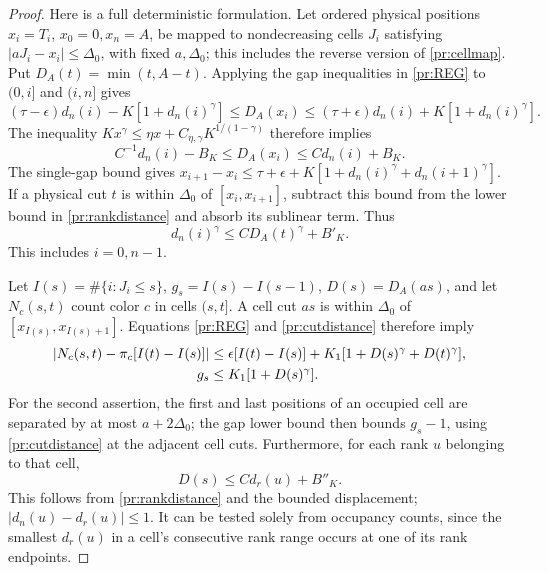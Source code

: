 \begin{proof}
Here is a full deterministic formulation. Let ordered physical positions
$x_i=T_i$, $x_0=0,x_n=A$, be mapped to nondecreasing cells $J_i$ satisfying
$|aJ_i-x_i|\le\Delta_0$, with fixed $a,\Delta_0$; this includes the reverse
version of \eqref{pr:cellmap}. Put $D_A(t)=\min(t,A-t)$.
Applying the gap inequalities in \eqref{pr:REG} to $(0,i]$ and $(i,n]$
gives
\[
 (\tau-\epsilon)d_n(i)-K[1+d_n(i)^\gamma]
 \le D_A(x_i)\le
 (\tau+\epsilon)d_n(i)+K[1+d_n(i)^\gamma].
\]
The inequality $Kx^\gamma\le\eta x+C_{\eta,\gamma}K^{1/(1-\gamma)}$
therefore implies
\begin{equation}
 C^{-1}d_n(i)-B_K\le D_A(x_i)\le C d_n(i)+B_K.               \label{pr:rankdistance}
\end{equation}
The single-gap bound gives
$x_{i+1}-x_i\le\tau+\epsilon+K[1+d_n(i)^\gamma+d_n(i+1)^\gamma]$.
If a physical cut $t$ is within $\Delta_0$ of $[x_i,x_{i+1}]$, subtract
this bound from the lower bound in \eqref{pr:rankdistance} and absorb
its sublinear term. Thus
\begin{equation}
 d_n(i)^\gamma\le C D_A(t)^\gamma+B'_K.                     \label{pr:cutdistance}
\end{equation}
This includes $i=0,n-1$.

Let $I(s)=\#\{i:J_i\le s\}$, $g_s=I(s)-I(s-1)$,
$D(s)=D_A(as)$, and let $N_c(s,t)$ count color $c$ in cells $(s,t]$.
A cell cut $as$ is within $\Delta_0$ of $[x_{I(s)},x_{I(s)+1}]$.
Equations \eqref{pr:REG} and \eqref{pr:cutdistance} therefore imply
\begin{align}
 |N_c(s,t)-\pi_c[I(t)-I(s)]|
 &\le\epsilon[I(t)-I(s)]+K_1[1+D(s)^\gamma+D(t)^\gamma],\notag\\
 g_s&\le K_1[1+D(s)^\gamma].                               \label{pr:cell-envelopes}
\end{align}
For the second assertion, the first and last positions of an occupied
cell are separated by at most $a+2\Delta_0$; the gap lower bound then
bounds $g_s-1$, using \eqref{pr:cutdistance} at the adjacent cell cuts.
Furthermore, for each rank $u$ belonging to that cell,
\begin{equation}
 D(s)\le C d_r(u)+B''_K.                                   \label{pr:cell-rank}
\end{equation}
This follows from \eqref{pr:rankdistance} and the bounded displacement;
$|d_n(u)-d_r(u)|\le1$. It can be tested solely from occupancy counts,
since the smallest $d_r(u)$ in a cell's consecutive rank range occurs
at one of its rank endpoints.


\end{proof}
